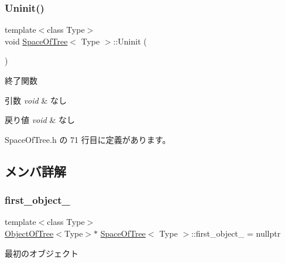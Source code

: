 \subsubsection{\texorpdfstring{Uninit()}{Uninit()}}
{\footnotesize\ttfamily template$<$class Type$>$ \\
void \mbox{\hyperlink{class_space_of_tree}{Space\+Of\+Tree}}$<$ Type $>$\+::Uninit (\begin{DoxyParamCaption}{ }\end{DoxyParamCaption})\hspace{0.3cm}{\ttfamily [inline]}}



終了関数 


\begin{DoxyParams}{引数}
{\em void} & なし \\
\hline
\end{DoxyParams}

\begin{DoxyRetVals}{戻り値}
{\em void} & なし \\
\hline
\end{DoxyRetVals}


 Space\+Of\+Tree.\+h の 71 行目に定義があります。



\subsection{メンバ詳解}
\mbox{\label{class_space_of_tree_af47684080d10ec625f1ebbf6492bf99a}} 
\subsubsection{\texorpdfstring{first\+\_\+object\+\_\+}{first\_object\_}}
{\footnotesize\ttfamily template$<$class Type$>$ \\
\mbox{\hyperlink{class_object_of_tree}{Object\+Of\+Tree}}$<$Type$>$$\ast$ \mbox{\hyperlink{class_space_of_tree}{Space\+Of\+Tree}}$<$ Type $>$\+::first\+\_\+object\+\_\+ = nullptr\hspace{0.3cm}{\ttfamily [private]}}



最初のオブジェクト 



